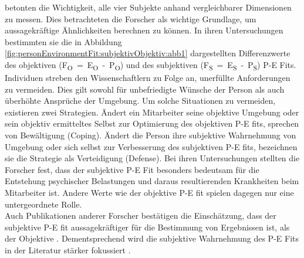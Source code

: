 \textcite{copingAndAdaption:1974} betonten die Wichtigkeit, alle vier Subjekte anhand vergleichbarer Dimensionen zu messen. Dies betrachteten die Forscher als wichtige Grundlage, um aussagekräftige Ähnlichkeiten berechnen zu können. In ihren Untersuchungen bestimmten sie die in Abbildung \ref{fig:personEnvironmentFit:subjektivObjektiv:abb1} dargestellten Differenzwerte des objektiven \mbox{(F\textsubscript{O} = E\textsubscript{O} - P\textsubscript{O})} und des subjektiven \mbox{(F\textsubscript{S} = E\textsubscript{S} - P\textsubscript{S})} P-E Fits. Individuen streben den Wissenschaftlern zu Folge an, unerfüllte Anforderungen zu vermeiden. Dies gilt sowohl für unbefriedigte Wünsche der Person als auch überhöhte Ansprüche der Umgebung. Um solche Situationen zu vermeiden, existieren zwei Strategien. Ändert ein Mitarbeiter seine objektive Umgebung oder sein objektiv ermitteltes Selbst zur Optimierung des objektiven P-E fits, sprechen \textcite{copingAndAdaption:1974} von Bewältigung (Coping). Ändert die Person ihre subjektive Wahrnehmung von Umgebung oder sich selbst zur Verbesserung des subjektiven P-E fits, bezeichnen sie die Strategie als Verteidigung (Defense). Bei ihren Untersuchungen stellten die Forscher fest, dass der subjektive P-E Fit besonders bedeutsam für die Entstehung psychischer Belastungen und daraus resultierenden Krankheiten beim Mitarbeiter ist. Andere Werte wie der objektive P-E fit spielen dagegen nur eine untergeordnete Rolle. \\
Auch Publikationen anderer Forscher bestätigen die Einschätzung, dass der subjektive P-E fit aussagekräftiger für die Bestimmung von Ergebnissen ist, als der Objektive \cite[S. 3]{carless:2005}. Dementsprechend wird die subjektive Wahrnehmung des P-E Fits in der Literatur stärker fokussiert \cite[S. 8]{caplan:1987}\cite[S. 9]{caplan:1993}\cite[S. 16]{choi:2004}.\\
